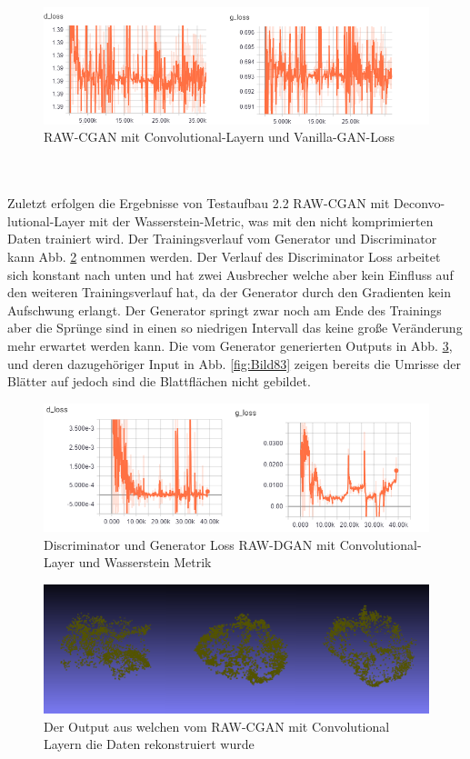 \documentclass{llncs}
\begin{document}
\begin{figure}[htbp] 
	\centering
	\includegraphics[width=1.0\textwidth]{cgan_loss_vanilla.png}
	\caption{RAW-CGAN mit Convolutional-Layern und Vanilla-GAN-Loss}
	\label{fig:Bild79}
\end{figure}
\newpage
~\\\\
Zuletzt erfolgen die Ergebnisse von Testaufbau 2.2 RAW-CGAN mit Deconvo-lutional-Layer mit der Wasserstein-Metric, was mit den nicht komprimierten Daten trainiert wird.  Der Trainingsverlauf vom Generator und Discriminator kann Abb. \ref{fig:Bild1001} entnommen werden.  Der Verlauf des Discriminator Loss arbeitet sich konstant nach unten und hat zwei Ausbrecher welche aber kein Einfluss auf den weiteren Trainingsverlauf hat, da der Generator durch den Gradienten kein Aufschwung erlangt. Der Generator springt zwar noch am Ende des Trainings aber die Sprünge sind in einen so niedrigen Intervall das keine große Veränderung mehr erwartet werden kann. Die vom Generator generierten Outputs in Abb. \ref{fig:Bild82}, und deren dazugehöriger Input in Abb. \ref{fig:Bild83} zeigen bereits die Umrisse der Blätter auf jedoch sind die Blattflächen nicht gebildet. 
\begin{figure}[htbp] 
	\centering
	\includegraphics[width=1.0\textwidth]{cgan_ws_loss.png}
	\caption{Discriminator und Generator Loss RAW-DGAN mit Convolutional-Layer und Wasserstein Metrik}
	\label{fig:Bild1001}
\end{figure}
\begin{figure}[htbp] 
	\centering
	\includegraphics[width=1.0\textwidth]{raw_cgan_ws_fake.png}
	\caption{Der Output aus welchen vom RAW-CGAN mit Convolutional Layern die Daten rekonstruiert wurde}
	\label{fig:Bild82}
\end{figure}
\end{document}
